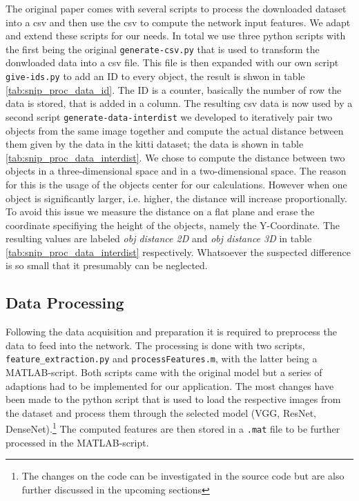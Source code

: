 \documentclass[a4paper, 11pt]{article}
\begin{document}
\begin{multicols}{2}
\begin{flushleft}
The original paper comes with several scripts to process the downloaded dataset into a csv and then use the csv to compute the network input features. We adapt and extend these scripts for our needs. In total we use three python scripts with the first being the original \texttt{generate-csv.py} that is used to transform the donwloaded data into a csv file. This file is then expanded with our own script \texttt{give-ids.py} to add an ID to every object, the result is shwon in table \ref{tab:snip_proc_data_id}. The ID is a counter, basically the number of row the data is stored, that is added in a column. The resulting csv data is now used by a second script \texttt{generate-data-interdist} we developed to iteratively pair two objects from the same image together and compute the actual distance between them given by the data in the kitti dataset; the data is shown in table \ref{tab:snip_proc_data_interdist}. We chose to compute the distance between two objects in a three-dimensional space and in a two-dimensional space. The reason for this is the usage of the objects center for our calculations. However when one object is significantly larger, i.e. higher, the distance will increase proportionally. To avoid this issue we measure the distance on a flat plane and erase the coordinate specifiying the height of the objects, namely the Y-Coordinate. The resulting values are labeled \textit{obj distance 2D} and \textit{obj distance 3D} in table \ref{tab:snip_proc_data_interdist} respectively. Whatsoever the suspected difference is so small that it presumably can be neglected.
\end{flushleft}

\subsection{Data Processing}
\begin{flushleft}
Following the data acquisition and preparation it is required to preprocess the data to feed into the network. The processing is done with two scripts, \texttt{feature\_extraction.py} and \texttt{processFeatures.m}, with the latter being a MATLAB-script. Both scripts came with the original model but a series of adaptions had to be implemented for our application. The most changes have been made to the python script that is used to load the respective images from the dataset and process them through the selected model (VGG, ResNet, DenseNet).\footnote{The changes on the code can be investigated in the source code but are also further discussed in the upcoming sections} The computed features are then stored in a \texttt{.mat} file to be further processed in the MATLAB-script.


\end{flushleft}
\end{multicols}
\end{document}
